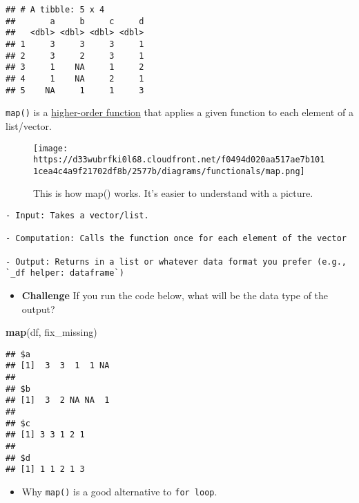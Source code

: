 \documentclass[
]{book}
\newenvironment{Shaded}{\begin{snugshade}}{\end{snugshade}}
\newcommand{\KeywordTok}[1]{\textcolor[rgb]{0.13,0.29,0.53}{\textbf{#1}}}
\newcommand{\NormalTok}[1]{#1}
\providecommand{\tightlist}{%
  \setlength{\itemsep}{0pt}\setlength{\parskip}{0pt}}
\begin{document}
\begin{verbatim}
## # A tibble: 5 x 4
##       a     b     c     d
##   <dbl> <dbl> <dbl> <dbl>
## 1     3     3     3     1
## 2     3     2     3     1
## 3     1    NA     1     2
## 4     1    NA     2     1
## 5    NA     1     1     3
\end{verbatim}

\texttt{map()} is a \href{https://en.wikipedia.org/wiki/Map_(higher-order_function)}{higher-order function} that applies a given function to each element of a list/vector.

\begin{figure}
\centering
\texttt{[image: https://d33wubrfki0l68.cloudfront.net/f0494d020aa517ae7b1011cea4c4a9f21702df8b/2577b/diagrams/functionals/map.png]}
\caption{This is how map() works. It's easier to understand with a picture.}
\end{figure}

\begin{verbatim}
- Input: Takes a vector/list. 

- Computation: Calls the function once for each element of the vector 

- Output: Returns in a list or whatever data format you prefer (e.g., `_df helper: dataframe`)
\end{verbatim}

\begin{itemize}
\tightlist
\item
  \textbf{Challenge} If you run the code below, what will be the data type of the output?
\end{itemize}

\begin{Shaded}
\begin{Highlighting}[]
\KeywordTok{map}\NormalTok{(df, fix\_missing)}
\end{Highlighting}
\end{Shaded}

\begin{verbatim}
## $a
## [1]  3  3  1  1 NA
## 
## $b
## [1]  3  2 NA NA  1
## 
## $c
## [1] 3 3 1 2 1
## 
## $d
## [1] 1 1 2 1 3
\end{verbatim}

\begin{itemize}
\tightlist
\item
  Why \texttt{map()} is a good alternative to \texttt{for\ loop}.
\end{itemize}
\end{document}
